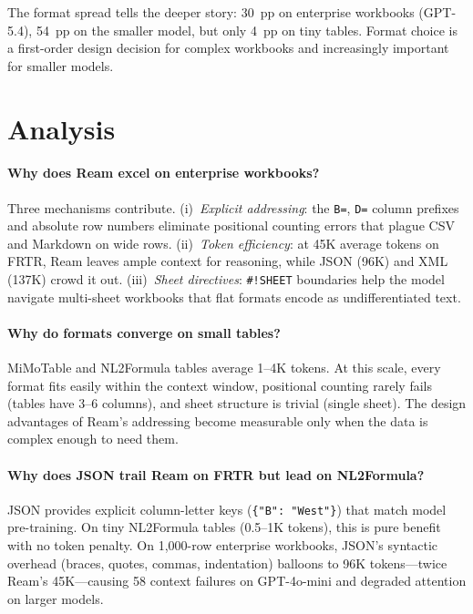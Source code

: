 \documentclass[11pt]{article}
\begin{document}
The format spread tells the deeper story: 30~pp on enterprise workbooks (GPT-5.4), 54~pp on the smaller model, but only 4~pp on tiny tables.
Format choice is a first-order design decision for complex workbooks and increasingly important for smaller models.

\section{Analysis}
\label{sec:analysis}

\paragraph{Why does Ream excel on enterprise workbooks?}
Three mechanisms contribute.
(i)~\emph{Explicit addressing}: the \texttt{B=}, \texttt{D=} column prefixes and absolute row numbers eliminate positional counting errors that plague CSV and Markdown on wide rows.
(ii)~\emph{Token efficiency}: at 45K average tokens on FRTR, Ream leaves ample context for reasoning, while JSON (96K) and XML (137K) crowd it out.
(iii)~\emph{Sheet directives}: \texttt{\#!SHEET} boundaries help the model navigate multi-sheet workbooks that flat formats encode as undifferentiated text.

\paragraph{Why do formats converge on small tables?}
MiMoTable and NL2Formula tables average 1--4K tokens.
At this scale, every format fits easily within the context window, positional counting rarely fails (tables have 3--6 columns), and sheet structure is trivial (single sheet).
The design advantages of Ream's addressing become measurable only when the data is complex enough to need them.

\paragraph{Why does JSON trail Ream on FRTR but lead on NL2Formula?}
JSON provides explicit column-letter keys (\texttt{\{"B": "West"\}}) that match model pre-training.
On tiny NL2Formula tables (0.5--1K tokens), this is pure benefit with no token penalty.
On 1,000-row enterprise workbooks, JSON's syntactic overhead (braces, quotes, commas, indentation) balloons to 96K tokens---twice Ream's 45K---causing 58 context failures on GPT-4o-mini and degraded attention on larger models.
\end{document}
